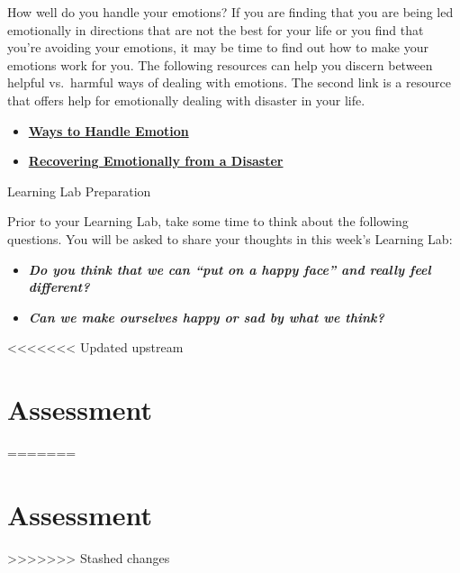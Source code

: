 \documentclass[
]{book}
\providecommand{\tightlist}{%
  \setlength{\itemsep}{0pt}\setlength{\parskip}{0pt}}
\begin{document}
\begin{reflect}
How well do you handle your emotions? If you are finding that you are being led emotionally in directions that are not the best for your life or you find that you're avoiding your emotions, it may be time to find out how to make your emotions work for you. The following resources can help you discern between helpful vs.~harmful ways of dealing with emotions. The second link is a resource that offers help for emotionally dealing with disaster in your life.

\begin{itemize}
\tightlist
\item
  \href{https://www.mhanational.org/helpful-vs-harmful-ways-manage-emotions}{\textbf{Ways to Handle Emotion}}\\
\item
  \href{https://www.apa.org/helpcenter/recovering-disasters}{\textbf{Recovering Emotionally from a Disaster}}
\end{itemize}

{Learning Lab Preparation}

Prior to your Learning Lab, take some time to think about the following questions. You will be asked to share your thoughts in this week's Learning Lab:

\begin{itemize}
\tightlist
\item
  \textbf{\emph{Do you think that we can ``put on a happy face'' and really feel different?}}\\
\item
  \textbf{\emph{Can we make ourselves happy or sad by what we think?}}
\end{itemize}
\end{reflect}

<<<<<<< Updated upstream
\hypertarget{assessment-7}{%
\section*{Assessment}\label{assessment-7}}
=======
\hypertarget{assessment-6}{%
\section*{Assessment}\label{assessment-6}}
>>>>>>> Stashed changes
\end{document}
